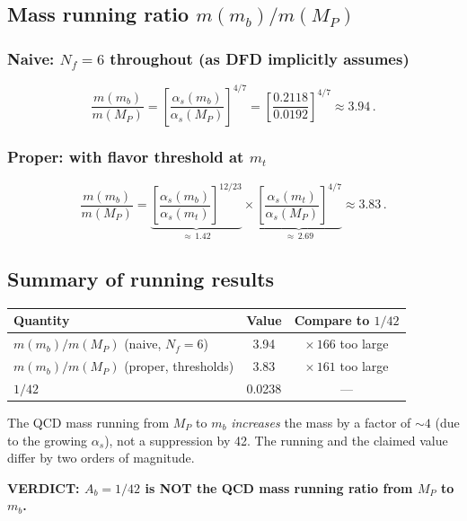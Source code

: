 \documentclass[11pt,a4paper]{article}
\newcommand{\as}{\alpha_s}
\newcommand{\Nf}{N_f}
\theoremstyle{definition}
\theoremstyle{remark}
\begin{document}
\subsection{Mass running ratio $m(m_b)/m(M_P)$}

\subsubsection{Naive: $\Nf = 6$ throughout (as DFD implicitly assumes)}

\begin{equation}
\frac{m(m_b)}{m(M_P)} = \left[\frac{\as(m_b)}{\as(M_P)}\right]^{4/7}
= \left[\frac{0.2118}{0.0192}\right]^{4/7} \approx \mathbf{3.94}\,.
\end{equation}

\subsubsection{Proper: with flavor threshold at $m_t$}

\begin{equation}
\frac{m(m_b)}{m(M_P)} =
\underbrace{\left[\frac{\as(m_b)}{\as(m_t)}\right]^{12/23}}_{\approx\,1.42}
\times
\underbrace{\left[\frac{\as(m_t)}{\as(M_P)}\right]^{4/7}}_{\approx\,2.69}
\approx \mathbf{3.83}\,.
\end{equation}

\subsection{Summary of running results}

\begin{center}
\begin{tabular}{lcc}
\toprule
Quantity & Value & Compare to $1/42$ \\
\midrule
$m(m_b)/m(M_P)$ (naive, $\Nf=6$) & 3.94 & $\times\, 166$ too large \\
$m(m_b)/m(M_P)$ (proper, thresholds) & 3.83 & $\times\, 161$ too large \\
$1/42$ & 0.0238 & --- \\
\bottomrule
\end{tabular}
\end{center}

\noindent The QCD mass running from $M_P$ to $m_b$ \emph{increases} the mass
by a factor of $\sim 4$ (due to the growing $\as$), not a suppression by 42.
The running and the claimed value differ by two orders of magnitude.

\textcolor{fail}{\textbf{VERDICT: $A_b = 1/42$ is NOT the QCD mass running
ratio from $M_P$ to $m_b$.}}
\end{document}
